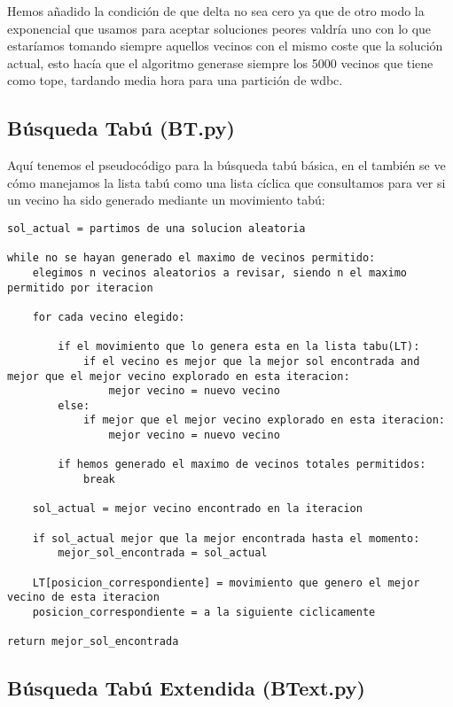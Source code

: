 \documentclass[10pt,a4paper]{article}
\begin{document}
Hemos añadido la condición de que delta no sea cero ya que de otro modo la exponencial que usamos para aceptar soluciones peores valdría uno con lo que estaríamos tomando siempre aquellos vecinos con el mismo coste que la solución actual, esto hacía que el algoritmo generase siempre los 5000 vecinos que tiene como tope, tardando media hora para una partición de wdbc.\\

\newpage
\subsection{\color[rgb]{0.0,0.0,0.51}Búsqueda Tabú (BT.py)}

Aquí tenemos el pseudocódigo para la búsqueda tabú básica, en el también se ve cómo manejamos la lista tabú como una lista cíclica que consultamos para ver si un vecino ha sido generado mediante un movimiento tabú:\\

\begin{lstlisting}
sol_actual = partimos de una solucion aleatoria

while no se hayan generado el maximo de vecinos permitido:
	elegimos n vecinos aleatorios a revisar, siendo n el maximo permitido por iteracion

	for cada vecino elegido:

		if el movimiento que lo genera esta en la lista tabu(LT):
			if el vecino es mejor que la mejor sol encontrada and mejor que el mejor vecino explorado en esta iteracion:
				mejor vecino = nuevo vecino
		else:
			if mejor que el mejor vecino explorado en esta iteracion:
				mejor vecino = nuevo vecino

		if hemos generado el maximo de vecinos totales permitidos:
			break

	sol_actual = mejor vecino encontrado en la iteracion

	if sol_actual mejor que la mejor encontrada hasta el momento:
		mejor_sol_encontrada = sol_actual

	LT[posicion_correspondiente] = movimiento que genero el mejor vecino de esta iteracion
	posicion_correspondiente = a la siguiente ciclicamente

return mejor_sol_encontrada
\end{lstlisting}

\newpage
\subsection{\color[rgb]{0.0,0.0,0.51}Búsqueda Tabú Extendida (BText.py)}
\end{document}
